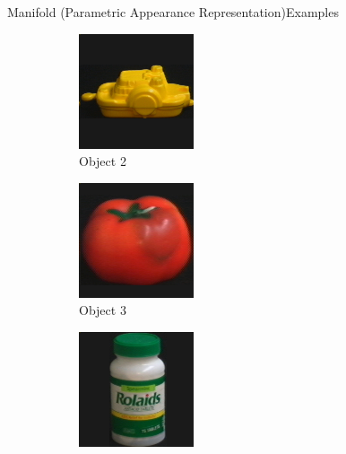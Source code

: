 \documentclass[aspectratio=169, handout, 10pt, hyperref=colorlinks]{beamer}
\begin{document}
\begin{frame}{Manifold (Parametric Appearance Representation)}{Examples}
    \begin{figure}
        \centering
        \begin{subfigure}{0.32\linewidth}
            \centering
            \includegraphics[width = 0.6\linewidth]{splines/obj3__0.png}
            \vspace{1em}
            \caption{Object 2}
        \end{subfigure}
        \begin{subfigure}{0.32\linewidth}
            \centering
            \includegraphics[width = 0.6\linewidth]{splines/obj4__0.png}
            \vspace{1em}
            \caption{Object 3}
        \end{subfigure}
        \begin{subfigure}{0.32\linewidth}
            \centering
            \includegraphics[width = 0.6\linewidth]{splines/obj5__0.png}

\end{subfigure}
\end{figure}
\end{frame}
\end{document}
